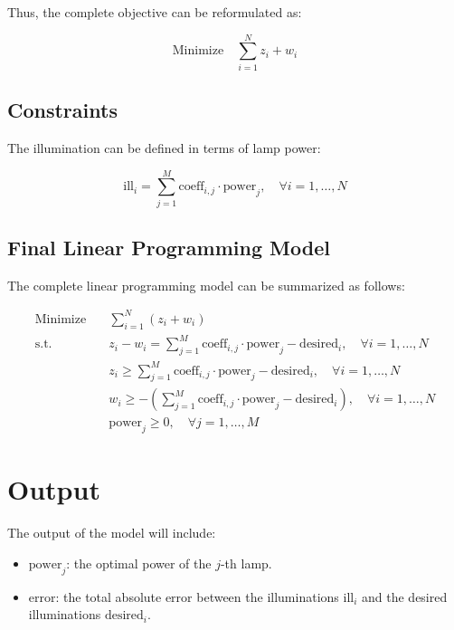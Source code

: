 \documentclass{article}
\begin{document}
Thus, the complete objective can be reformulated as:

\[
\text{Minimize} \quad \sum_{i=1}^{N} z_i + w_i
\]

\subsection*{Constraints}

The illumination can be defined in terms of lamp power:

\[
\text{ill}_i = \sum_{j=1}^{M} \text{coeff}_{i,j} \cdot \text{power}_j, \quad \forall i = 1, \ldots, N
\]

\subsection*{Final Linear Programming Model}

The complete linear programming model can be summarized as follows:

\begin{align*}
\text{Minimize} \quad & \sum_{i=1}^{N} (z_i + w_i) \\
\text{s.t.} \quad & z_i - w_i = \sum_{j=1}^{M} \text{coeff}_{i,j} \cdot \text{power}_j - \text{desired}_i, \quad \forall i = 1, \ldots, N \\
& z_i \geq \sum_{j=1}^{M} \text{coeff}_{i,j} \cdot \text{power}_j - \text{desired}_i, \quad \forall i = 1, \ldots, N \\
& w_i \geq -\left(\sum_{j=1}^{M} \text{coeff}_{i,j} \cdot \text{power}_j - \text{desired}_i\right), \quad \forall i = 1, \ldots, N \\
& \text{power}_j \geq 0, \quad \forall j = 1, \ldots, M
\end{align*}

\section*{Output}

The output of the model will include:

\begin{itemize}
    \item \( \text{power}_j \): the optimal power of the \( j \)-th lamp.
    \item \( \text{error} \): the total absolute error between the illuminations \( \text{ill}_i \) and the desired illuminations \( \text{desired}_i \).
\end{itemize}
\end{document}

